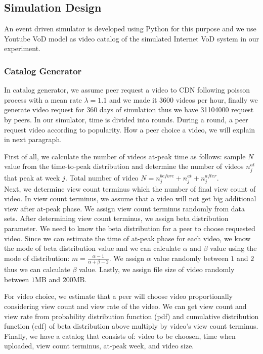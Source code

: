 \documentclass[conference]{IEEEtran}
\begin{document}
\subsection{Simulation Design}\label{simulationdesign}
An event driven simulator is developed using Python for this purpose and we use Youtube VoD model as video catalog of the simulated Internet VoD system in our experiment.

\subsubsection{Catalog Generator}
In catalog generator, we assume peer request a video to CDN following poisson process with a mean rate $\lambda=1.1$ \cite{Zink:2009:CYN:1502814.1502987} and we made it 3600 videos per hour, finally we generate video request for 360 days of simulation thus we have 31104000 request by peers. 
In our simulator, time is divided into rounds. 
During a round, a peer request video according to popularity. 
How a peer choice a video, we will explain in next paragraph.

First of all, we calculate the number of videos at-peak time as follows: sample $N$ value from the time-to-peak distribution and determine the number of videos $n_j^{at}$ that peak at week $j$. 
Total number of video $N = n_j^{before} + n_j^{at} + n_j^{after}$.\\
Next, we determine view count terminus which the number of final view count of video.
In view count terminus, we assume that a video will not get big additional view after at-peak phase.
We assign view count terminus randomly from data sets.
After determining view count terminus, we assign beta distribution parameter. 
We need to know the beta distribution for a peer to choose requested video.  
Since we can estimate the time of at-peak phase for each video, we know the mode of beta distribution value and we can calculate $\alpha$ and $\beta$ value using the mode of distribution: $m=\frac{\alpha-1}{\alpha + \beta - 2}$.  
We assign $\alpha$ value randomly between $1$ and $2$ thus we can calculate $\beta$ value.
Lastly, we assign file size of video randomly between $1$MB and $200$MB.

For video choice, we estimate that a peer will choose video proportionally considering view count and view rate of the video.   
We can get view count and view rate from probability distribution function (pdf) and cumulative distribution function (cdf) of beta distribution above multiply by video's view count terminus.
Finally, we have a catalog that consists of: video to be choosen, time when uploaded, view count terminus, at-peak week, and video size.
\end{document}
